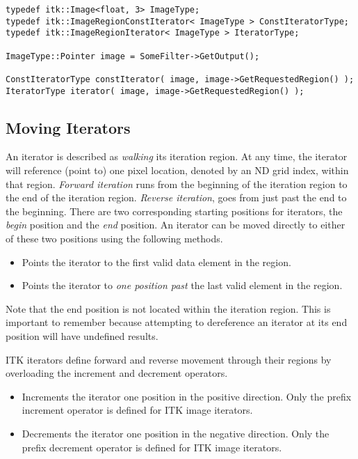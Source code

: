 \small
\begin{verbatim}
typedef itk::Image<float, 3> ImageType;
typedef itk::ImageRegionConstIterator< ImageType > ConstIteratorType;
typedef itk::ImageRegionIterator< ImageType > IteratorType;

ImageType::Pointer image = SomeFilter->GetOutput();

ConstIteratorType constIterator( image, image->GetRequestedRegion() );
IteratorType iterator( image, image->GetRequestedRegion() );
\end{verbatim}
\normalsize

\subsection{Moving Iterators}
\label{sec:MovingIterators}
An iterator is described as \emph{walking} its iteration region.  At any time,
the iterator will reference (point to) one pixel location, denoted by an ND
grid index, within that region. \emph{Forward iteration} runs from the beginning of the iteration
region to the end of the iteration region.  \emph{Reverse iteration},
goes from just past the end to the beginning.  There are two
corresponding starting positions for iterators, the \emph{begin} position and
the \emph{end} position.  An iterator can be moved directly to either of these
two positions using the following methods.


\begin{itemize}
\item \textbf{} Points the iterator to the first valid
data element in the region.

\item \textbf{} Points the iterator to \emph{one position past}
the last valid element in the region.
\end{itemize}

Note that the end position is not located within the iteration region.  This is
important to remember because attempting to dereference an iterator at its end
position will have undefined results.

ITK iterators define forward and reverse movement through their regions by
overloading the increment and decrement operators.

\begin{itemize}
\item \textbf{} Increments the iterator one position in the
positive direction.  Only the prefix increment operator is defined for ITK image
iterators.

\item \textbf{} Decrements the iterator one position in the
negative direction.  Only the prefix decrement operator is defined for ITK
image iterators. 
\end{itemize}

